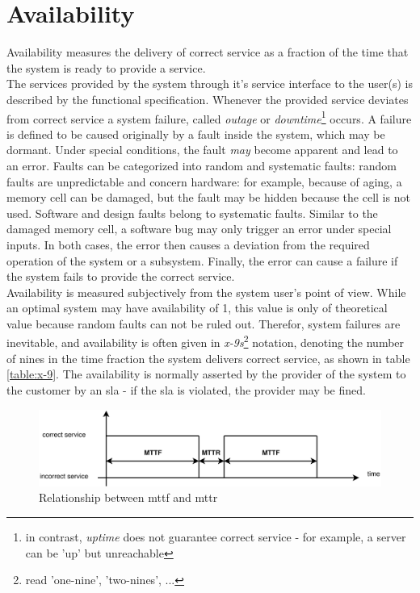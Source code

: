 \section{Availability}

Availability measures the delivery of correct service as a fraction of the time that the system is ready to provide a service. 
\\
The services provided by the system through it's service interface to the user(s) 
is described by the functional specification. Whenever the provided service
deviates from correct service a system failure, called \textit{outage} or \textit{downtime}\footnote{in contrast, \textit{uptime} does not guarantee correct
service - for example, a server can be 'up' but unreachable} occurs. A failure is defined to be caused originally by a fault inside the system, which may be 
dormant. Under special conditions, the fault \textit{may} become apparent and lead to an error. Faults can be categorized into random and systematic faults:
random faults are unpredictable and concern hardware: for example, because of aging, a memory cell can be damaged, but the fault may be hidden because the cell
is not used. Software and design faults belong to systematic faults. Similar to the damaged memory cell, a software bug may only 
trigger an error under special inputs. In both cases, the error then causes a deviation from the required operation of the system or a subsystem. Finally, the 
error can cause a failure if the system fails to provide the correct service.
\\
Availability is measured subjectively from the system user's point of view.
While an optimal system may have availability of 1, this value is only of theoretical value because random faults can not be ruled out. Therefor,
system failures are inevitable, and availability is often given in \textit{x-9s}\footnote{read 'one-nine', 'two-nines', ...} notation, denoting the 
number of nines in the time fraction the system delivers correct service, as shown in table \ref{table:x-9}.
The availability is normally asserted by the provider of the system to the customer by an
\gls{sla} - if the \gls{sla} is violated, the provider may be fined.
\begin{figure}
    \centering
    \includegraphics[width=1\textwidth]{figures/availability}
    \caption{Relationship between \gls{mttf} and \gls{mttr}}
    \label{fig:relmttfmttr}
\end{figure}
